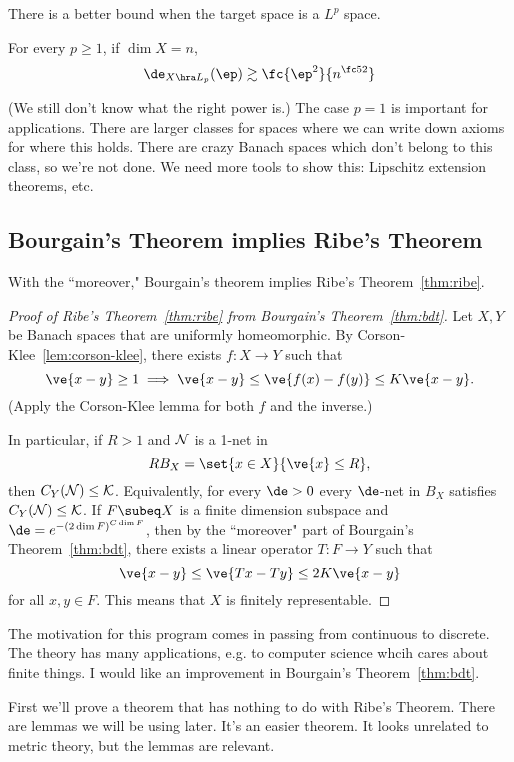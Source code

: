 There is a better bound when the target space is a $L^p$ space.
\begin{thm}
For every $p\ge 1$, if $\dim X=n$,
\[
\de_{X\hra L_p}(\ep)\gtrsim \fc{\ep^2}{n^{\fc 52}}
\]
\end{thm}
(We still don't know what the right power is.) 
The case $p=1$ is important for applications. There are larger classes for spaces where we can write down axioms for where this holds. 
There are crazy Banach spaces which don't belong to this class, so we're not done. %
We need more tools to show this: Lipschitz extension theorems, etc.

\subsection{Bourgain's Theorem implies Ribe's Theorem}

With the ``moreover," Bourgain's theorem implies Ribe's Theorem~\ref{thm:ribe}.

\begin{proof}[Proof of Ribe's Theorem~\ref{thm:ribe} from Bourgain's Theorem~\ref{thm:bdt}]
Let $X,Y$ be Banach spaces that are uniformly homeomorphic. By Corson-Klee~\ref{lem:corson-klee}, there exists $f:X\to Y$ such that 
\[
\ve{x-y}\ge 1\implies \ve{x-y}\le \ve{f(x)-f(y)}\le K\ve{x-y}.
\]
(Apply the Corson-Klee lemma for both $f$ and the inverse.)

In particular, if $R>1$ and $\cal N$ is a 1-net in 
\[
RB_X = \set{x\in X}{\ve{x}\le R},
\]
then $C_Y(\cal N)\le K$.
Equivalently, for every $\de>0$ every $\de$-net in $B_X$ satisfies $C_Y(\cal N)\le K$. 
If $F\subeq X$ is a finite dimension subspace and $\de = e^{-(2\dim F)^{C\dim F}}$, then by the ``moreover" part of Bourgain's Theorem~\ref{thm:bdt}, there exists a linear operator $T: F\to Y$ such that 
\[
\ve{x-y}\le \ve{Tx-Ty}\le 2K\ve{x-y}
\]
for all $x,y\in F$. This means that $X$ is finitely representable. 
\end{proof}
The motivation for this program comes in passing from continuous to discrete. The theory has many applications, e.g. to computer science whcih cares about finite things.
I would like an improvement in Bourgain's Theorem~\ref{thm:bdt}.

First we'll prove a theorem that has nothing to do with Ribe's Theorem. There are lemmas we will be using later. It's an easier theorem. It looks unrelated to metric theory, but the lemmas are relevant. 

